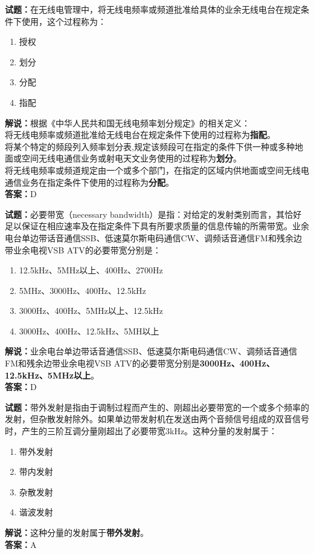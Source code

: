 \documentclass{ctexbook}
\begin{document}
\noindent\textbf{试题：}在无线电管理中，将无线电频率或频道批准给具体的业余无线电台在规定条件下使用，这个过程称为：
\begin{enumerate}[leftmargin=3em]
  \item 授权
  \item 划分
  \item 分配
  \item 指配
\end{enumerate}
\noindent\textbf{解说：}根据《中华人民共和国无线电频率划分规定》的相关定义：\\将无线电频率或频道批准给无线电台在规定条件下使用的过程称为\textbf{指配}。\\将某个特定的频段列入频率划分表,规定该频段可在指定的条件下供一种或多种地面或空间无线电通信业务或射电天文业务使用的过程称为\textbf{划分}。\\将无线电频率或频道规定由一个或多个部门，在指定的区域内供地面或空间无线电通信业务在指定条件下使用的过程称为\textbf{分配}。\\
\textbf{答案：}D

\vspace{\baselineskip}

\noindent\textbf{试题：}必要带宽（necessary bandwidth）是指：对给定的发射类别而言，其恰好足以保证在相应速率及在指定条件下具有所要求质量的信息传输的所需带宽。业余电台单边带话音通信SSB、低速莫尔斯电码通信CW、调频话音通信FM和残余边带业余电视VSB ATV的必要带宽分别是：
\begin{enumerate}[leftmargin=3em]
  \item 12.5\unit{\kHz}、5\unit{\MHz}以上、400Hz、2700Hz
  \item 5\unit{\MHz}、3000Hz、400Hz、12.5\unit{\kHz}
  \item 3000Hz、400Hz、5\unit{\MHz}以上、12.5\unit{\kHz}
  \item 3000Hz、400Hz、12.5\unit{\kHz}、5MH以上
\end{enumerate}
\noindent\textbf{解说：}业余电台单边带话音通信SSB、低速莫尔斯电码通信CW、调频话音通信FM和残余边带业余电视VSB ATV的必要带宽分别是\textbf{3000Hz、400Hz、12.5\unit{\kHz}、5\unit{\MHz}以上}。\\\noindent\textbf{答案：}D

\vspace{\baselineskip}

\noindent\textbf{试题：}带外发射是指由于调制过程而产生的、刚超出必要带宽的一个或多个频率的发射，但杂散发射除外。如果单边带发射机在发送由两个音频信号组成的双音信号时，产生的三阶互调分量刚超出了必要带宽3\unit{\kHz}。这种分量的发射属于：
\begin{enumerate}[leftmargin=3em]
  \item 带外发射
  \item 带内发射
  \item 杂散发射
  \item 谐波发射
\end{enumerate}
\noindent\textbf{解说：}这种分量的发射属于\textbf{带外发射}。\\\noindent\textbf{答案：}A
\end{document}
